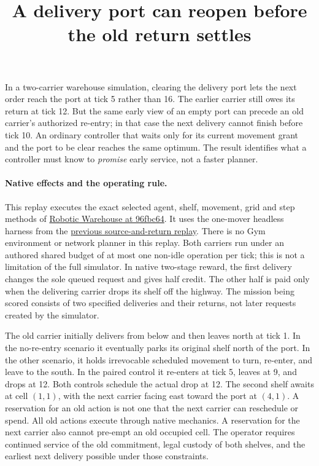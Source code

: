 \documentclass[11pt]{article}
\title{A delivery port can reopen before the old return settles}
\author{}
\date{}
\begin{document}
\maketitle

In a two-carrier warehouse simulation, clearing the delivery port lets the next order reach the port at tick 5 rather than 16. The earlier carrier still owes its return at tick 12. But the same early view of an empty port can precede an old carrier's authorized re-entry; in that case the next delivery cannot finish before tick 10. An ordinary controller that waits only for its current movement grant and the port to be clear reaches the same optimum. The result identifies what a controller must know to \emph{promise} early service, not a faster planner.

\paragraph{Native effects and the operating rule.}
This replay executes the exact selected agent, shelf, movement, grid and step methods of \href{https://github.com/semitable/robotic-warehouse/blob/96fbc64e3eae5fee915e0d390f864fa06ddccd47/rware/warehouse.py}{Robotic Warehouse at 96fbc64}. It uses the one-mover headless harness from the \href{https://github.com/eternal-november/eos-research-programmes/pull/418}{previous source-and-return replay}. There is no Gym environment or network planner in this replay. Both carriers run under an authored shared budget of at most one non-idle operation per tick; this is not a limitation of the full simulator. In native two-stage reward, the first delivery changes the sole queued request and gives half credit. The other half is paid only when the delivering carrier drops its shelf off the highway. The mission being scored consists of two specified deliveries and their returns, not later requests created by the simulator.

The old carrier initially delivers from below and then leaves north at tick 1. In the no-re-entry scenario it eventually parks its original shelf north of the port. In the other scenario, it holds irrevocable scheduled movement to turn, re-enter, and leave to the south. In the paired control it re-enters at tick 5, leaves at 9, and drops at 12. Both controls schedule the actual drop at 12. The second shelf awaits at cell $(1,1)$, with the next carrier facing east toward the port at $(4,1)$. A reservation for an old action is not one that the next carrier can reschedule or spend. All old actions execute through native mechanics. A reservation for the next carrier also cannot pre-empt an old occupied cell. The operator requires continued service of the old commitment, legal custody of both shelves, and the earliest next delivery possible under those constraints.
\end{document}
